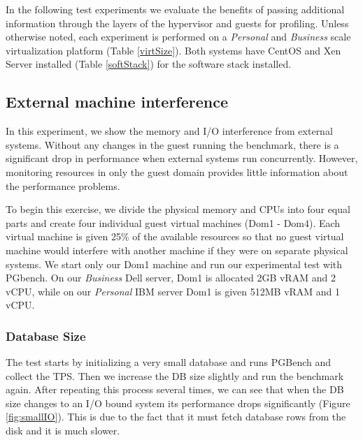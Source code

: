 In the following test experiments we evaluate the benefits of passing additional information through the layers of the hypervisor and guests for profiling.  Unless otherwise noted, each experiment is performed on a \emph{Personal} and \emph{Business} scale virtualization platform (Table \ref{virtSize}).  Both systems have CentOS and Xen Server installed (Table \ref{softStack}) for the software stack installed.

\subsection{External machine interference}
In this experiment, we show the memory and I/O interference from external systems.  
Without any changes in the guest running the benchmark, there is a significant drop in performance when external systems run concurrently.  
However, monitoring resources in only the guest domain provides little information about the performance problems. 

To begin this exercise, we divide the physical memory and CPUs into four equal parts and create four individual guest virtual machines (Dom1 - Dom4).  
Each virtual machine is given 25\% of the available resources so that no guest virtual machine would interfere with another machine if they were on separate physical systems.  
We start only our Dom1 machine and run our experimental test with PGbench.  
On our \emph{Business} Dell server, Dom1 is allocated 2GB vRAM and 2 vCPU, while on our \emph{Personal} IBM server Dom1 is given 512MB vRAM and 1 vCPU.  

\subsubsection{Database Size}
The test starts by initializing a very small database and runs PGBench and collect the TPS.  
Then we increase the DB size slightly and run the benchmark again.  
After repeating this process several times, we can see that when the DB size changes to an I/O bound system its performance drops significantly (Figure \ref{fig:smallIO}).  
This is due to the fact that it must fetch database rows from the disk and it is much slower.  

